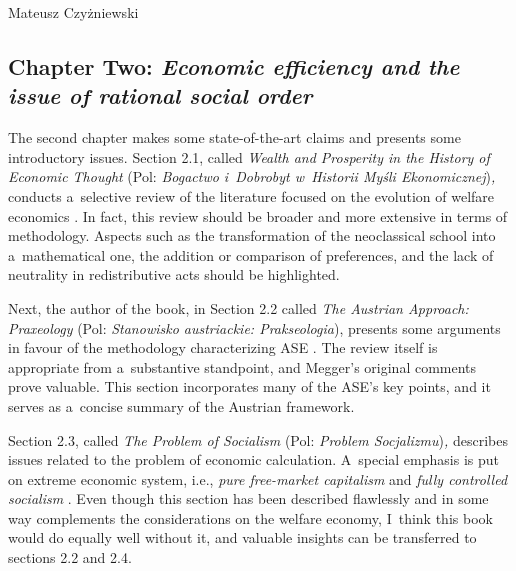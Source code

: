\begin{newrevengenv}{Mateusz Czyżniewski}
\subsection{Chapter Two: \textit{Economic efficiency and the issue of rational social order}}



The second chapter makes some state-of-the-art claims and presents some introductory issues. Section 2.1, called \textit{Wealth and Prosperity in the History of Economic Thought} (Pol: \textit{Bogactwo i~Dobrobyt w~Historii Myśli Ekonomicznej})\textit{,} conducts a~selective review of the literature focused on the evolution of welfare economics 
\parencite[][pp.25–34]{megger_sprawiedliwosc_2021}. %
 In fact, this review should be broader and more extensive in terms of methodology. Aspects such as the transformation of the neoclassical school into a~mathematical one, the addition or comparison of preferences, and the lack of neutrality in redistributive acts should be highlighted.



Next, the author of the book, in Section 2.2 called \textit{The Austrian Approach: Praxeology} (Pol: \textit{Stanowisko austriackie: Prakseologia}), presents some arguments in favour of the methodology characterizing ASE 
\parencite[][pp.34–43]{megger_sprawiedliwosc_2021}. %
 The review itself is appropriate from a~substantive standpoint, and Megger's original comments prove valuable. This section incorporates many of the ASE's key points, and it serves as a~concise summary of the Austrian framework.



Section 2.3, called \textit{The Problem of Socialism} (Pol: \textit{Problem Socjalizmu})\textit{,} describes issues related to the problem of economic calculation. A~special emphasis is put on extreme economic system, i.e., \textit{pure free-market capitalism} and \textit{fully controlled socialism} 
\parencite[][pp.43–49]{megger_sprawiedliwosc_2021}. %
 Even though this section has been described flawlessly and in some way complements the considerations on the welfare economy, I~think this book would do equally well without it, and valuable insights can be transferred to sections 2.2 and 2.4.




\end{newrevengenv}
